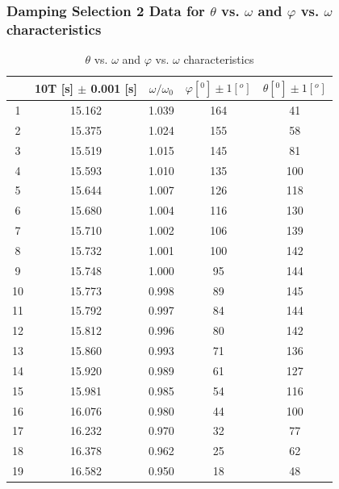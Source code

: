 \documentclass[12pt]{article}
\begin{document}
\subsubsection{Damping Selection 2 Data for $\theta$ vs. $\omega$ and $\varphi$ vs. $\omega$ characteristics}
\begin{table}[H]
\centering
\begin{tabular}{|c|c|c|c|c|}
\hline
   & 10T [s] $\pm$ 0.001 [s] &$\omega/\omega_{0}$&$\varphi [^0] \pm 1 [^o]$&$\theta [^0] \pm 1 [^o]$     \\ \hline
1  & 15.162 &1.039& 164 & 41  \\ \hline
2  & 15.375 &1.024& 155 & 58  \\ \hline
3  & 15.519 &1.015& 145 & 81  \\ \hline
4  & 15.593 &1.010& 135 & 100 \\ \hline
5  & 15.644 &1.007& 126 & 118 \\ \hline
6  & 15.680 &1.004& 116 & 130 \\ \hline
7  & 15.710 &1.002& 106 & 139 \\ \hline
8  & 15.732 &1.001& 100 & 142 \\ \hline
9  & 15.748 &1.000& 95  & 144 \\ \hline
10 & 15.773 &0.998& 89  & 145 \\ \hline
11 & 15.792 &0.997& 84  & 144 \\ \hline
12 & 15.812 &0.996& 80  & 142 \\ \hline
13 & 15.860 &0.993& 71  & 136 \\ \hline
14 & 15.920 &0.989& 61  & 127 \\ \hline
15 & 15.981 &0.985& 54  & 116 \\ \hline
16 & 16.076 &0.980& 44  & 100 \\ \hline
17 & 16.232 &0.970& 32  & 77  \\ \hline
18 & 16.378 &0.962& 25  & 62  \\ \hline
19 & 16.582 &0.950& 18  & 48  \\ \hline
\end{tabular}
\caption{$\theta$ vs. $\omega$ and $\varphi$ vs. $\omega$ characteristics}
\end{table}
\end{document}
